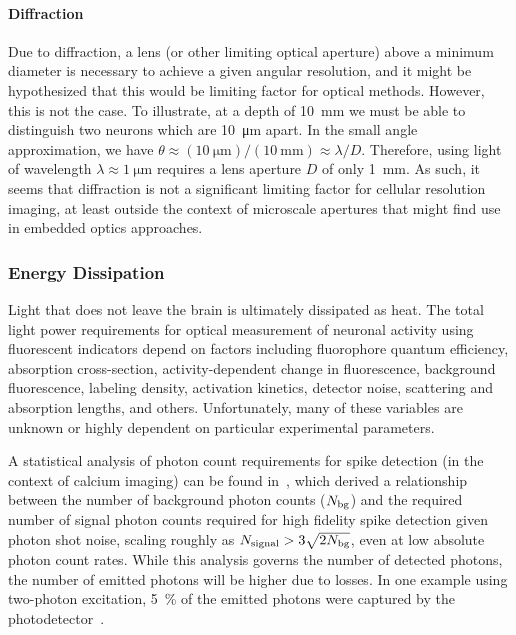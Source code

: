 \paragraph{Diffraction}
Due to diffraction, a lens (or other limiting optical aperture) above a minimum diameter is necessary to
achieve a given angular resolution, and it might be hypothesized that this would be limiting
factor for optical methods.
However, this is not the case.
To illustrate, at a depth of \SI{10}{\milli\meter} we must be able to distinguish two neurons which are \SI{10}{\micro\meter} apart.
In the small angle approximation, we have $\theta \approx (\SI{10}{\micro\meter})/(\SI{10}{\milli\meter}) \approx \lambda/D$. Therefore, using light of wavelength $\lambda\approx\SI{1}{\micro\meter}$ requires a lens aperture $D$ of only \SI{1}{\milli\meter}.
As such, it seems that diffraction is not a significant limiting factor for cellular resolution imaging, at least outside the context of microscale apertures that might find use in embedded optics approaches.


\subsubsection{Energy Dissipation}

Light that does not leave the brain is ultimately dissipated as heat.
The total light power requirements for optical measurement of neuronal activity using fluorescent indicators depend on factors including
fluorophore quantum efficiency,
absorption cross-section,
activity-dependent change in fluorescence,
background fluorescence,
labeling density,
activation kinetics,
detector noise,
scattering and absorption lengths,
and others. Unfortunately, many of these variables are unknown or highly dependent on particular experimental parameters.

A statistical analysis of photon count requirements for spike detection (in the context of calcium imaging) can be found in~\cite{wilt13}, which derived a relationship between the number of background photon counts ($N_{\text{\scriptsize bg}}$) and the required number of signal photon counts required for high fidelity spike detection given photon shot noise, scaling roughly as $N_{\text{\scriptsize signal}} > 3\sqrt{2N_{\text{\scriptsize bg}}}$, even at low absolute photon count rates.
While this analysis governs the number of detected photons, the number of emitted photons will be higher due to losses.
In one example using two-photon excitation, \SI{5}{\percent} of the emitted photons were captured by the photodetector~\cite{kim99}.

